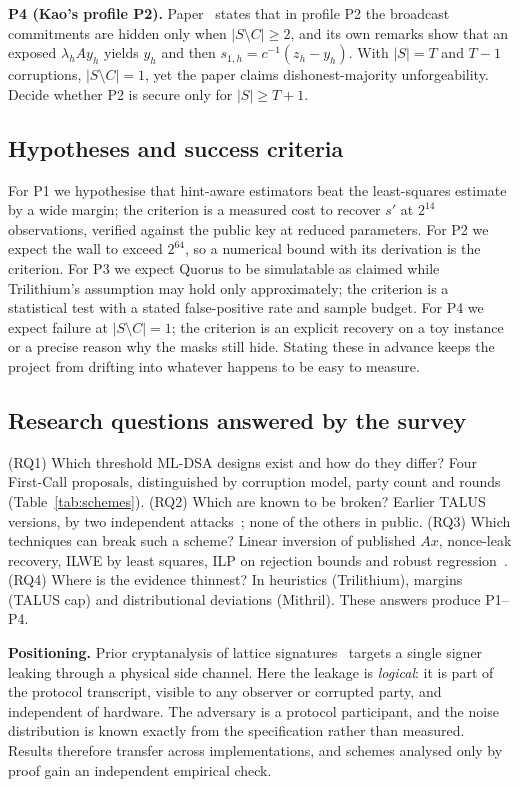 \documentclass[10pt,conference,a4paper]{IEEEtran}
\begin{document}
\textbf{P4 (Kao's profile P2).} Paper~\cite{kao} states that in profile P2 the broadcast commitments are hidden only when
$|S\setminus C|\ge2$, and its own remarks show that an exposed $\lambda_h A y_h$ yields $y_h$ and then
$s_{1,h}=c^{-1}(z_h-y_h)$. With $|S|=T$ and $T-1$ corruptions, $|S\setminus C|=1$, yet the paper claims dishonest-majority
unforgeability. Decide whether P2 is secure only for $|S|\ge T+1$.

\subsection{Hypotheses and success criteria}
For P1 we hypothesise that hint-aware estimators beat the least-squares estimate by a wide margin; the criterion is a
measured cost to recover $s'$ at $2^{14}$ observations, verified against the public key at reduced parameters. For P2 we
expect the wall to exceed $2^{64}$, so a numerical bound with its derivation is the criterion. For P3 we expect Quorus to
be simulatable as claimed while Trilithium's assumption may hold only approximately; the criterion is a statistical test
with a stated false-positive rate and sample budget. For P4 we expect failure at $|S\setminus C|=1$; the criterion is an
explicit recovery on a toy instance or a precise reason why the masks still hide. Stating these in advance keeps the
project from drifting into whatever happens to be easy to measure.

\subsection{Research questions answered by the survey}
(RQ1) Which threshold ML-DSA designs exist and how do they differ? Four First-Call proposals, distinguished by
corruption model, party count and rounds (Table~\ref{tab:schemes}). (RQ2) Which are known to be broken? Earlier TALUS
versions, by two independent attacks~\cite{niot}; none of the others in public. (RQ3) Which techniques can break such a
scheme? Linear inversion of published $Ax$, nonce-leak recovery, ILWE by least squares, ILP on rejection bounds and
robust regression~\cite{niot,ilwe,rejected,concealed}. (RQ4) Where is the evidence thinnest? In heuristics (Trilithium),
margins (TALUS cap) and distributional deviations (Mithril). These answers produce P1--P4.

\textbf{Positioning.} Prior cryptanalysis of lattice signatures~\cite{ilwe,rejected,concealed,yates} targets a single
signer leaking through a physical side channel. Here the leakage is \emph{logical}: it is part of the protocol
transcript, visible to any observer or corrupted party, and independent of hardware. The adversary is a protocol
participant, and the noise distribution is known exactly from the specification rather than measured. Results therefore
transfer across implementations, and schemes analysed only by proof gain an independent empirical check.
\end{document}
